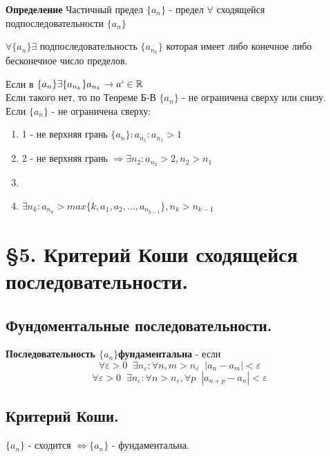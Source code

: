 \documentclass[12pt, a4paper]{article}
\newcommand{\R}{\mathbb{R}}
\newcommand{\eps}{\varepsilon}
\begin{document}
\begin{tcolorbox}
    \textbf{Определение} Частичный предел $\{a_n\}$ - предел $\forall$ сходящейся подпоследовательности $\{a_n\}$
\end{tcolorbox}
\begin{tcolorbox}[title=Следствие из теоремы]
    $\forall \{a_n\} \exists$ подпоследовательность $\{a_{n_k}\}$ которая имеет либо конечное либо бесконечное число пределов.
\end{tcolorbox}
\begin{tcolorbox}[title=Доказательство]
    Если в $\{a_n\} \exists \{a_{n_k}\} a_{n_k} \to a` \in \R$\\
    Если такого нет, то по Теореме Б-В $\{a_{n}\}$ - не ограничена сверху или снизу.\\

    Если $\{a_{n}\} $ - не ограничена сверху:
    \begin{enumerate}
        \item 1 - не верхняя грань $\{a_{n}\}: a_{n_1}: a_{n_1} > 1$
        \item 2 - не верхняя грань $\Rightarrow \exists n_2: a_{n_2}>2, n_2>n_1$
        \item[...]
        \item [k.] $\exists n_k: a_{n_k}>max\{k, a_1, a_2, ..., a_{n_{k-1}}\}, n_k>n_{k-1}$
    \end{enumerate}
\end{tcolorbox}

\section{\S 5. Критерий Коши сходящейся последовательности.}
\subsection{Фундоментальные последовательности.}
\begin{tcolorbox}
    \textbf{Последовательность $\{a_n\} $фундаментальна} - если
    \[\forall \eps>0 \;\; \exists n_\eps : \forall n, m > n_\eps \;\; |a_n-a_m| < \eps\]
    \[ \forall \eps>0 \;\; \exists n_\eps : \forall n > n_\eps,\forall  p \;\; |a_{n+p}-a_n| < \eps \]
\end{tcolorbox}

\subsection{Критерий Коши.}
\begin{tcolorbox}
    $\{a_n\}$ - сходится $\Leftrightarrow \{a_n\}$ - фундаментальна.
\end{tcolorbox}
\end{document}
